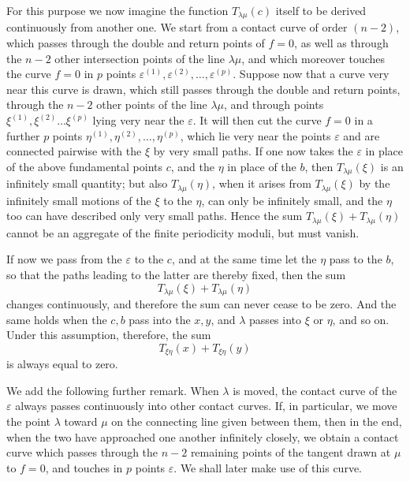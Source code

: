 \documentclass[10pt]{article}
\begin{document}
For this purpose we now imagine the function \(T_{\lambda\mu}(c)\) itself to be derived continuously from another one. We start from a contact curve of order \((n-2)\), which passes through the double and return points of \(f=0\), as well as through the \(n-2\) other intersection points of the line \(\lambda\mu\), and which moreover touches the curve \(f=0\) in \(p\) points \(\varepsilon^{(1)},\varepsilon^{(2)},\ldots,\varepsilon^{(p)}\). Suppose now that a curve very near this curve is drawn, which still passes through the double and return points, through the \(n-2\) other points of the line \(\lambda\mu\), and through points \(\xi^{(1)},\xi^{(2)}\ldots\xi^{(p)}\) lying very near the \(\varepsilon\). It will then cut the curve \(f=0\) in a further \(p\) points \(\eta^{(1)},\eta^{(2)},\ldots,\eta^{(p)}\), which lie very near the points \(\varepsilon\) and are connected pairwise with the \(\xi\) by very small paths. If one now takes the \(\varepsilon\) in place of the above fundamental points \(c\), and the \(\eta\) in place of the \(b\), then \(T_{\lambda\mu}(\xi)\) is an infinitely small quantity; but also \(T_{\lambda\mu}(\eta)\), when it arises from \(T_{\lambda\mu}(\xi)\) by the infinitely small motions of the \(\xi\) to the \(\eta\), can only be infinitely small, and the \(\eta\) too can have described only very small paths. Hence the sum \(T_{\lambda\mu}(\xi)+T_{\lambda\mu}(\eta)\) cannot be an aggregate of the finite periodicity moduli, but must vanish.

If now we pass from the \(\varepsilon\) to the \(c\), and at the same time let the \(\eta\) pass to the \(b\), so that the paths leading to the latter are thereby fixed, then the sum
\[
T_{\lambda\mu}(\xi)+T_{\lambda\mu}(\eta)
\]
changes continuously, and therefore the sum can never cease to be zero. And the same holds when the \(c,b\) pass into the \(x,y\), and \(\lambda\) passes into \(\xi\) or \(\eta\), and so on. Under this assumption, therefore, the sum
\[
T_{\xi\eta}(x)+T_{\xi\eta}(y)
\]
is always equal to zero.

We add the following further remark. When \(\lambda\) is moved, the contact curve of the \(\varepsilon\) always passes continuously into other contact curves. If, in particular, we move the point \(\lambda\) toward \(\mu\) on the connecting line given between them, then in the end, when the two have approached one another infinitely closely, we obtain a contact curve which passes through the \(n-2\) remaining points of the tangent drawn at \(\mu\) to \(f=0\), and touches in \(p\) points \(\varepsilon\). We shall later make use of this curve.
\end{document}
